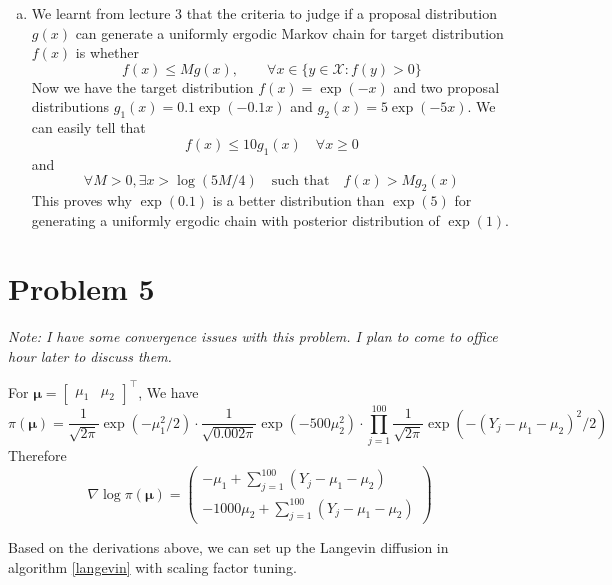 \documentclass[12pt]{article}
\begin{document}
\begin{enumerate}[(a)]
	\item We learnt from lecture 3 that the criteria to judge if a proposal distribution $g(x)$ can generate a uniformly ergodic Markov chain for target distribution $f(x)$ is whether
	\[ f(x) \leq Mg(x), \qquad \forall x \in \{ y\in \mathcal{X}: f(y)>0 \} \]
	Now we have the target distribution $f(x) = \exp(-x)$ and two proposal distributions $g_1(x) = 0.1\exp(-0.1x)$ and $g_2(x)=5\exp(-5x)$. We can easily tell that 
	\[ f(x)\leq 10g_1(x)\quad \forall x\geq 0 \]
	and 
	\[ \forall M>0, \exists x>\log(5M/4)\quad \text{such that}\quad f(x) > Mg_2(x) \]
	This proves why $\exp(0.1)$ is a better distribution than $\exp(5)$ for generating a uniformly ergodic chain with posterior distribution of $\exp(1)$.
\end{enumerate}



\section*{Problem 5}

\emph{Note: I have some convergence issues with this problem. I plan to come to office hour later to discuss them.}

 For $\bm{\mu} = \begin{bmatrix}\mu_1 & \mu_2\end{bmatrix}^\top$, We have 
 \[ \pi (\bm{\mu}) = \frac{1}{\sqrt{2\pi}} \exp\left( -\mu_1^2/2\right)\cdot \frac{1}{\sqrt{0.002\pi}}\exp\left( -500\mu_2^2\right)\cdot \prod_{j=1}^{100}\frac{1}{\sqrt{2\pi}} \exp \left(-(Y_j - \mu_1 - \mu_2)^2 / 2 \right)  \] 
Therefore
\[ \nabla \log \pi(\bm{\mu}) = \begin{pmatrix}
	-\mu_1 + \sum_{j=1}^{100}(Y_j - \mu_1 - \mu_2) \\
	-1000 \mu_2 + \sum_{j=1}^{100}(Y_j - \mu_1 - \mu_2)
 \end{pmatrix} \]

Based on the derivations above, we can set up the Langevin diffusion in algorithm \ref{langevin} with scaling factor tuning. 
\end{document}
